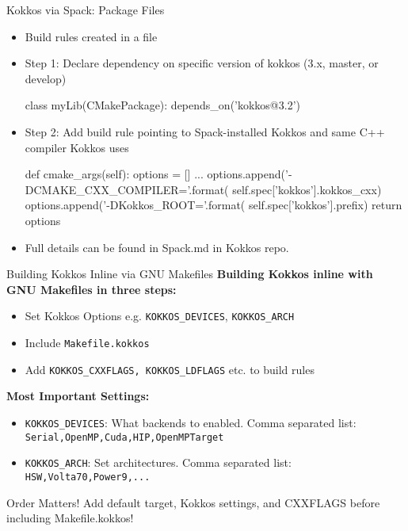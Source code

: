 \begin{frame}[fragile]{Kokkos via Spack: Package Files}
\begin{itemize}
\item Build rules created in a  file
\item Step 1: Declare dependency on specific version of kokkos (3.x, master, or develop)
\begin{shell}
class myLib(CMakePackage):
  depends_on('kokkos@3.2')
\end{shell}
\item Step 2: Add build rule pointing to Spack-installed Kokkos and same C++ compiler Kokkos uses
\begin{shell}
def cmake_args(self):
  options = []
  ...
  options.append('-DCMAKE_CXX_COMPILER={}'.format(
     self.spec['kokkos'].kokkos_cxx)
  options.append('-DKokkos_ROOT={}'.format(
     self.spec['kokkos'].prefix)
  return options
\end{shell}
\item Full details can be found in Spack.md in Kokkos repo.
\end{itemize}
\end{frame}

\begin{frame}[fragile]{Building Kokkos Inline via GNU Makefiles}
	\textbf{Building Kokkos inline with GNU Makefiles in three steps:}

        \begin{itemize}
	        \item Set Kokkos Options e.g. \texttt{KOKKOS\_DEVICES}, \texttt{KOKKOS\_ARCH}
		\item Include \texttt{Makefile.kokkos}
		\item Add \texttt{KOKKOS\_CXXFLAGS, KOKKOS\_LDFLAGS} etc. to build rules
	\end{itemize}

	\textbf{Most Important Settings:}

	\begin{itemize}
	   \item \texttt{KOKKOS\_DEVICES}: What backends to enabled. Comma separated list: \texttt{Serial,OpenMP,Cuda,HIP,OpenMPTarget}
	   \item \texttt{KOKKOS\_ARCH}: Set architectures. Comma separated list: \texttt{HSW,Volta70,Power9,...}
	\end{itemize}

	\pause
	\begin{block}{Order Matters!}
	   Add default target, Kokkos settings, and CXXFLAGS before including Makefile.kokkos!
	\end{block}
\end{frame}

